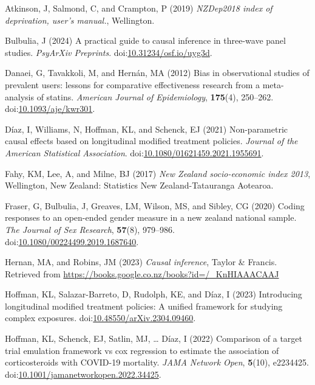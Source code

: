 \documentclass[
  singlecolumn]{article}
\newlength{\cslhangindent}
\newenvironment{CSLReferences}[2] %
 {\begin{list}{}{%
  \setlength{\itemindent}{0pt}
  \setlength{\leftmargin}{0pt}
  \setlength{\parsep}{0pt}
  \ifodd #1
   \setlength{\leftmargin}{\cslhangindent}
   \setlength{\itemindent}{-1\cslhangindent}
  \fi
  \setlength{\itemsep}{#2\baselineskip}}}
 {\end{list}}
\begin{document}
\label{refs}
\begin{CSLReferences}{1}{0}
Atkinson, J, Salmond, C, and Crampton, P (2019) \emph{NZDep2018 index of
deprivation, user{'}s manual.}, Wellington.

Bulbulia, J (2024) A practical guide to causal inference in three-wave
panel studies. \emph{PsyArXiv Preprints}.
doi:\href{https://doi.org/10.31234/osf.io/uyg3d}{10.31234/osf.io/uyg3d}.

Danaei, G, Tavakkoli, M, and Hernán, MA (2012) Bias in observational
studies of prevalent users: lessons for comparative effectiveness
research from a meta-analysis of statins. \emph{American Journal of
Epidemiology}, \textbf{175}(4), 250--262.
doi:\href{https://doi.org/10.1093/aje/kwr301}{10.1093/aje/kwr301}.

Díaz, I, Williams, N, Hoffman, KL, and Schenck, EJ (2021) Non-parametric
causal effects based on longitudinal modified treatment policies.
\emph{Journal of the American Statistical Association}.
doi:\href{https://doi.org/10.1080/01621459.2021.1955691}{10.1080/01621459.2021.1955691}.

Fahy, KM, Lee, A, and Milne, BJ (2017) \emph{New Zealand socio-economic
index 2013}, Wellington, New Zealand: Statistics New Zealand-Tatauranga
Aotearoa.

Fraser, G, Bulbulia, J, Greaves, LM, Wilson, MS, and Sibley, CG (2020)
Coding responses to an open-ended gender measure in a new zealand
national sample. \emph{The Journal of Sex Research}, \textbf{57}(8),
979--986.
doi:\href{https://doi.org/10.1080/00224499.2019.1687640}{10.1080/00224499.2019.1687640}.

Hernan, MA, and Robins, JM (2023) \emph{Causal inference}, Taylor \&
Francis. Retrieved from
\url{https://books.google.co.nz/books?id=/_KnHIAAACAAJ}

Hoffman, KL, Salazar-Barreto, D, Rudolph, KE, and Díaz, I (2023)
Introducing longitudinal modified treatment policies: A unified
framework for studying complex exposures.
doi:\href{https://doi.org/10.48550/arXiv.2304.09460}{10.48550/arXiv.2304.09460}.

Hoffman, KL, Schenck, EJ, Satlin, MJ, \ldots{} Díaz, I (2022) Comparison
of a target trial emulation framework vs cox regression to estimate the
association of corticosteroids with COVID-19 mortality. \emph{JAMA
Network Open}, \textbf{5}(10), e2234425.
doi:\href{https://doi.org/10.1001/jamanetworkopen.2022.34425}{10.1001/jamanetworkopen.2022.34425}.


\end{CSLReferences}
\end{document}
